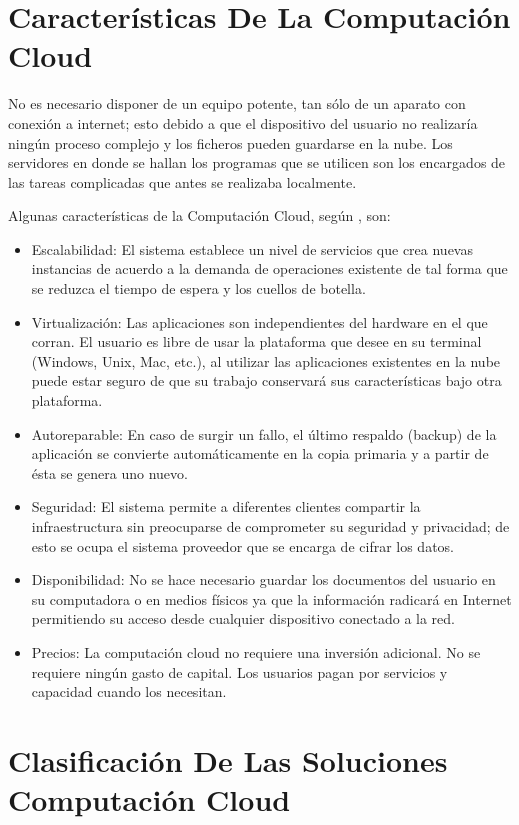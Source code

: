 \documentclass[a4paper, 12pt]{report}
\begin{document}
\section{Caracter\'isticas De La Computaci\'on Cloud}
\begin{justify}
No es necesario disponer de un equipo potente, tan s\'olo de un aparato con conexi\'on a internet; esto debido a que el dispositivo del usuario no realizar\'ia ning\'un proceso complejo y los ficheros pueden guardarse en la nube. Los servidores en donde se hallan los programas que se utilicen son los encargados de las tareas complicadas que antes se realizaba localmente.
\end{justify}
Algunas caracter\'isticas de la Computaci\'on Cloud, seg\'un \cite{oscarAvilaMejia}, son:
\begin{itemize}
    \item{Escalabilidad:} El sistema establece un nivel de servicios que crea nuevas instancias de acuerdo a la demanda de operaciones existente de tal forma que se reduzca el tiempo de espera y los cuellos de botella.
    \item{Virtualizaci\'on:} Las aplicaciones son independientes del hardware en el que corran. El usuario es libre de usar la plataforma que desee en su terminal (Windows, Unix, Mac, etc.), al utilizar las aplicaciones existentes en la nube puede estar seguro de que su trabajo conservar\'a sus caracter\'isticas bajo otra plataforma.
    \item{Autoreparable:} En caso de surgir un fallo, el \'ultimo respaldo (backup) de la aplicaci\'on se convierte autom\'aticamente en la copia primaria y a partir de \'esta se genera uno nuevo.
    \item{Seguridad:} El sistema permite a diferentes clientes compartir la infraestructura sin preocuparse de comprometer su seguridad y privacidad; de esto se ocupa el sistema proveedor que se encarga de cifrar los datos.
    \item{Disponibilidad:} No se hace necesario guardar los documentos del usuario en su computadora o en medios f\'isicos ya que la informaci\'on radicar\'a en Internet permitiendo su acceso desde cualquier dispositivo conectado a la red.
    \item{Precios:} La computaci\'on cloud no requiere una inversión adicional. No se requiere ning\'un gasto de capital. Los usuarios pagan por servicios y capacidad cuando los necesitan.
\end{itemize}
\section{Clasificaci\'on De Las Soluciones Computaci\'on Cloud}
\end{document}
